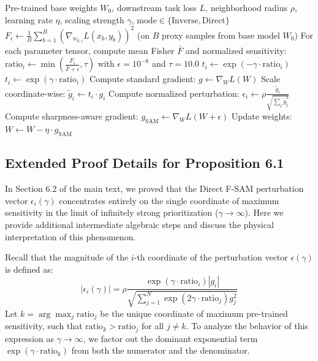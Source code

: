 \documentclass{article}
\theoremstyle{plain}
\theoremstyle{definition}
\theoremstyle{remark}
\begin{document}
\begin{algorithm}[H]
\caption{Fisher-Weighted Sharpness-Aware Minimization (F-SAM)}
\label{alg:fsam}
\begin{algorithmic}[1]
    Pre-trained base weights $W_0$, downstream task loss $L$, neighborhood radius $\rho$, learning rate $\eta$, scaling strength $\gamma$, $\text{mode} \in \{\text{Inverse}, \text{Direct}\}$
   \STATE $F_i \leftarrow \frac{1}{B} \sum_{b=1}^B \left( \nabla_{w_{0,i}} L(x_b, y_b) \right)^2$ (on $B$ proxy samples from base model $W_0$)
   \STATE For each parameter tensor, compute mean Fisher $\bar{F}$ and normalized sensitivity:
   \STATE $\text{ratio}_i \leftarrow \min\left(\frac{F_i}{\bar{F} + \epsilon}, \tau\right)$ with $\epsilon = 10^{-8}$ and $\tau = 10.0$
   \STATE $t_i \leftarrow \exp(-\gamma \cdot \text{ratio}_i)$
   \STATE $t_i \leftarrow \exp(\gamma \cdot \text{ratio}_i)$
   \ENDIF
   \STATE Compute standard gradient: $g \leftarrow \nabla_W L(W)$
   \STATE Scale coordinate-wise: $\tilde{g}_i \leftarrow t_i \cdot g_i$
   \STATE Compute normalized perturbation: $\epsilon_i \leftarrow \rho \frac{\tilde{g}_i}{\sqrt{\sum_j \tilde{g}_j^2}}$
   \STATE Compute sharpness-aware gradient: $g_{\text{SAM}} \leftarrow \nabla_W L(W + \epsilon)$
   \STATE Update weights: $W \leftarrow W - \eta \cdot g_{\text{SAM}}$
\end{algorithmic}
\end{algorithm}

\subsection{Extended Proof Details for Proposition 6.1}
In Section 6.2 of the main text, we proved that the Direct F-SAM perturbation vector $\epsilon_i(\gamma)$ concentrates entirely on the single coordinate of maximum sensitivity in the limit of infinitely strong prioritization ($\gamma \to \infty$). Here we provide additional intermediate algebraic steps and discuss the physical interpretation of this phenomenon.

Recall that the magnitude of the $i$-th coordinate of the perturbation vector $\epsilon(\gamma)$ is defined as:
\begin{equation}
    |\epsilon_i(\gamma)| = \rho \frac{\exp(\gamma \cdot \text{ratio}_i) |g_i|}{\sqrt{\sum_{j=1}^N \exp(2\gamma \cdot \text{ratio}_j) g_j^2}}
\end{equation}
Let $k = \arg\max_j \text{ratio}_j$ be the unique coordinate of maximum pre-trained sensitivity, such that $\text{ratio}_k > \text{ratio}_j$ for all $j \neq k$. To analyze the behavior of this expression as $\gamma \to \infty$, we factor out the dominant exponential term $\exp(\gamma \cdot \text{ratio}_k)$ from both the numerator and the denominator.
\end{document}
